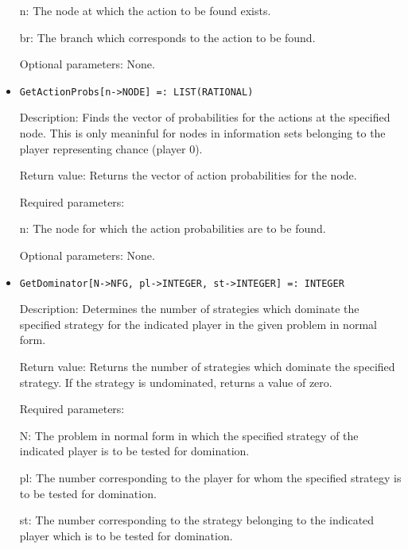 \begin{itemize}
\bd
\item
[n:] The node at which the action to be found exists.
\item
[br:] The branch which corresponds to the action to be found.
\ed

\item
[Optional parameters:] None.
\ed

\item
\protect \large \begin{verbatim}
GetActionProbs[n->NODE] =: LIST(RATIONAL)
\end{verbatim}\normalsize

\bd
\item
[Description:] Finds the vector of probabilities for the actions at
the specified node.  This is only meaninful for nodes in information
sets belonging to the player representing chance (player 0).
\item
[Return value:] Returns the vector of action probabilities for the
node.
\item
[Required parameters:]\hfil\null
	
\bd
\item
[n:] The node for which the action probabilities are to be found.
\ed

\item
[Optional parameters:] None.
\ed

\item
\protect \large \begin{verbatim}
GetDominator[N->NFG, pl->INTEGER, st->INTEGER] =: INTEGER
\end{verbatim}\normalsize

\bd
\item
[Description:] Determines the number of strategies which dominate the
specified strategy for the indicated player in the given problem in
normal form.
\item
[Return value:] Returns the number of strategies which dominate the
specified strategy.  If the strategy is undominated, returns a value
of zero.
\item
[Required parameters:]\hfil\null

\bd
\item
[N:] The problem in normal form in which the specified strategy of the
indicated player is to be tested for domination.
\item
[pl:] The number corresponding to the player for whom the specified
strategy is to be tested for domination.
\item
[st:] The number corresponding to the strategy belonging to the
indicated player which is to be tested for domination.
\ed


\end{itemize}
